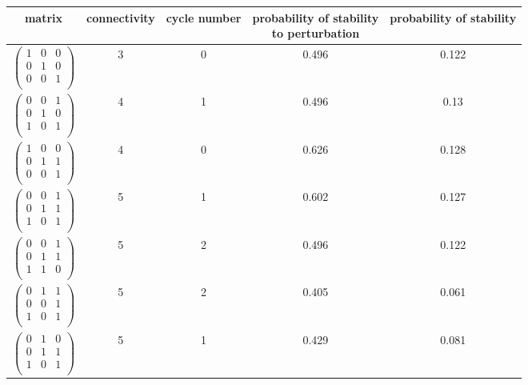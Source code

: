 \begin{longtable}{ c || c | c | c | c }
\hline
matrix & connectivity & cycle number & \specialcell{probability of stability\\to perturbation} & probability of stability\\
\hline
$\begin{pmatrix}
1 & 0 & 0\\
0 & 1 & 0\\
0 & 0 & 1\\
\end{pmatrix}$ & 3 & 0 & 0.496 & 0.122\\
$\begin{pmatrix}
0 & 0 & 1\\
0 & 1 & 0\\
1 & 0 & 1\\
\end{pmatrix}$ & 4 & 1 & 0.496 & 0.13\\
$\begin{pmatrix}
1 & 0 & 0\\
0 & 1 & 1\\
0 & 0 & 1\\
\end{pmatrix}$ & 4 & 0 & 0.626 & 0.128\\
$\begin{pmatrix}
0 & 0 & 1\\
0 & 1 & 1\\
1 & 0 & 1\\
\end{pmatrix}$ & 5 & 1 & 0.602 & 0.127\\
$\begin{pmatrix}
0 & 0 & 1\\
0 & 1 & 1\\
1 & 1 & 0\\
\end{pmatrix}$ & 5 & 2 & 0.496 & 0.122\\
$\begin{pmatrix}
0 & 1 & 1\\
0 & 0 & 1\\
1 & 0 & 1\\
\end{pmatrix}$ & 5 & 2 & 0.405 & 0.061\\
$\begin{pmatrix}
0 & 1 & 0\\
0 & 1 & 1\\
1 & 0 & 1\\
\end{pmatrix}$ & 5 & 1 & 0.429 & 0.081\\

\end{longtable}
